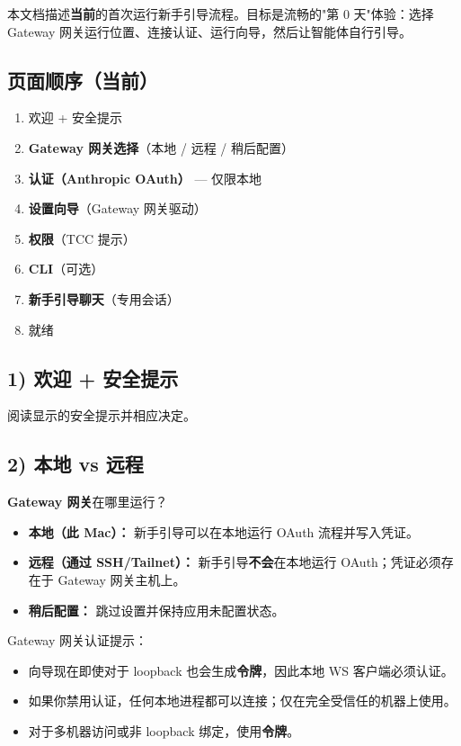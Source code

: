 本文档描述\textbf{当前}的首次运行新手引导流程。目标是流畅的"第 0 天"体验：选择 Gateway 网关运行位置、连接认证、运行向导，然后让智能体自行引导。

\subsection{页面顺序（当前）}


\begin{enumerate}
  \item 欢迎 + 安全提示
  \item \textbf{Gateway 网关选择}（本地 / 远程 / 稍后配置）
  \item \textbf{认证（Anthropic OAuth）} — 仅限本地
  \item \textbf{设置向导}（Gateway 网关驱动）
  \item \textbf{权限}（TCC 提示）
  \item \textbf{CLI}（可选）
  \item \textbf{新手引导聊天}（专用会话）
  \item 就绪
\end{enumerate}


\subsection{1) 欢迎 + 安全提示}


阅读显示的安全提示并相应决定。

\subsection{2) 本地 vs 远程}


\textbf{Gateway 网关}在哪里运行？

\begin{itemize}
  \item \textbf{本地（此 Mac）：} 新手引导可以在本地运行 OAuth 流程并写入凭证。
  \item \textbf{远程（通过 SSH/Tailnet）：} 新手引导\textbf{不会}在本地运行 OAuth；凭证必须存在于 Gateway 网关主机上。
  \item \textbf{稍后配置：} 跳过设置并保持应用未配置状态。
\end{itemize}


Gateway 网关认证提示：

\begin{itemize}
  \item 向导现在即使对于 loopback 也会生成\textbf{令牌}，因此本地 WS 客户端必须认证。
  \item 如果你禁用认证，任何本地进程都可以连接；仅在完全受信任的机器上使用。
  \item 对于多机器访问或非 loopback 绑定，使用\textbf{令牌}。
\end{itemize}


